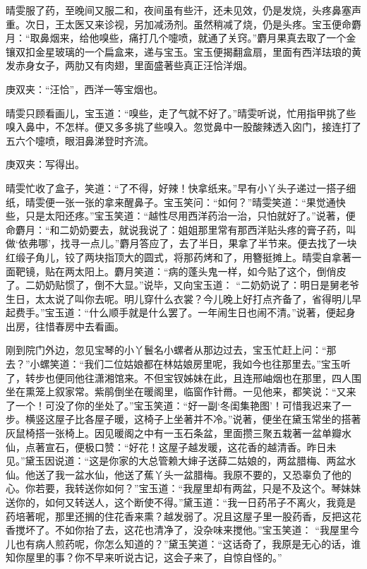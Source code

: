 \begin{parag}
    晴雯服了药，至晚间又服二和，夜间虽有些汗，还未见效，仍是发烧，头疼鼻塞声重。次日，王太医又来诊视，另加减汤剂。虽然稍减了烧，仍是头疼。宝玉便命麝月：“取鼻烟来，给他嗅些，痛打几个嚏喷，就通了关窍。”麝月果真去取了一个金镶双扣金星玻璃的一个扁盒来，递与宝玉。宝玉便揭翻盒扇，里面有西洋珐琅的黄发赤身女子，两肋又有肉翅，里面盛著些真正汪恰洋烟。\begin{note}庚双夹：“汪恰”，西洋一等宝烟也。\end{note}晴雯只顾看画儿，宝玉道：“嗅些，走了气就不好了。”晴雯听说，忙用指甲挑了些嗅入鼻中，不怎样。便又多多挑了些嗅入。忽觉鼻中一股酸辣透入囟门，接连打了五六个嚏喷，眼泪鼻涕登时齐流。\begin{note}庚双夹：写得出。\end{note}晴雯忙收了盒子，笑道：“了不得，好辣！快拿纸来。”早有小丫头子递过一搭子细纸，晴雯便一张一张的拿来醒鼻子。宝玉笑问：“如何？”晴雯笑道：“果觉通快些，只是太阳还疼。”宝玉笑道：“越性尽用西洋药治一治，只怕就好了。”说著，便命麝月：“和二奶奶要去，就说我说了：姐姐那里常有那西洋贴头疼的膏子药，叫做‘依弗哪’，找寻一点儿。”麝月答应了，去了半日，果拿了半节来。便去找了一块红缎子角儿，铰了两块指顶大的圆式，将那药烤和了，用簪挺摊上。晴雯自拿著一面靶镜，贴在两太阳上。麝月笑道：“病的蓬头鬼一样，如今贴了这个，倒俏皮了。二奶奶贴惯了，倒不大显。”说毕，又向宝玉道： “二奶奶说了：明日是舅老爷生日，太太说了叫你去呢。明儿穿什么衣裳？今儿晚上好打点齐备了，省得明儿早起费手。”宝玉道：“什么顺手就是什么罢了。一年闹生日也闹不清。”说著，便起身出房，往惜春房中去看画。
\end{parag}


\begin{parag}
    刚到院门外边，忽见宝琴的小丫鬟名小螺者从那边过去，宝玉忙赶上问：“那去？”小螺笑道：“我们二位姑娘都在林姑娘房里呢，我如今也往那里去。”宝玉听了，转步也便同他往潇湘馆来。不但宝钗姊妹在此，且连邢岫烟也在那里，四人围坐在熏笼上叙家常。紫鹃倒坐在暖阁里，临窗作针黹。一见他来，都笑说：“又来了一个！可没了你的坐处了。”宝玉笑道：“好一副‘冬闺集艳图’！可惜我迟来了一步。横竖这屋子比各屋子暖，这椅子上坐著并不冷。”说著，便坐在黛玉常坐的搭著灰鼠椅搭一张椅上。因见暖阁之中有一玉石条盆，里面攒三聚五栽著一盆单瓣水仙，点著宣石，便极口赞：“好花！这屋子越发暖，这花香的越清香。昨日未见。”黛玉因说道：“这是你家的大总管赖大婶子送薛二姑娘的，两盆腊梅、两盆水仙。他送了我一盆水仙，他送了蕉丫头一盆腊梅。我原不要的，又恐辜负了他的心。你若要，我转送你如何？”宝玉道：“我屋里却有两盆，只是不及这个。琴妹妹送你的，如何又转送人，这个断使不得。”黛玉道：“我一日药吊子不离火，我竟是药培著呢，那里还搁的住花香来熏？越发弱了。况且这屋子里一股药香，反把这花香搅坏了。不如你抬了去，这花也清净了，没杂味来搅他。”宝玉笑道： “我屋里今儿也有病人煎药呢，你怎么知道的？”黛玉笑道：“这话奇了，我原是无心的话，谁知你屋里的事？你不早来听说古记，这会子来了，自惊自怪的。”
\end{parag}


